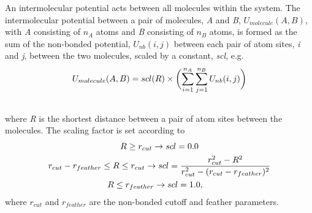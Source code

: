 \documentclass[letterpaper,10pt,english]{manual}
\begin{document}
An intermolecular potential acts between all molecules within the system. The intermolecular potential between a pair of molecules, \emph{A} and \emph{B}, $U_{molecule} (A, B)$, with \emph{A} consisting of $n_A$ atoms and \emph{B} consisting of $n_B$ atoms, is formed as the sum of the non-bonded potential, $U_{nb} (i, j)$ between each pair of atom sites, \emph{i} and \emph{j}, between the two molecules, scaled by a constant, \emph{scl}, e.g.
\hypertarget{equation-intermol1}{}\begin{gather}
\begin{split}U_{molecule}(A,B) = scl(R)\times\biggl( \sum_{i=1}^{n_A} \sum_{j=1}^{n_B} U_{nb}(i,j) \biggr)\end{split}\label{protoms-intermol1}\\\begin{split}\end{split}\notag
\end{gather}
where \emph{R} is the shortest distance between a pair of atom sites between the molecules. The scaling factor is set according to
\begin{gather}
\begin{split}&R \ge r_{cut} \rightarrow scl = 0.0 \\\end{split}\notag\\\begin{split}&r_{cut}-r_{feather} \le R \le r_{cut} \rightarrow scl = \frac{r_{cut}^2-R^2}{r_{cut}^2-(r_{cut}-r_{feather})^2} \\\end{split}\notag\\\begin{split}&R \le r_{feather} \rightarrow scl = 1.0,\end{split}\notag
\end{gather}
where $r_{cut}$ and $r_{feather}$ are the non-bonded cutoff and feather parameters.
\end{document}
